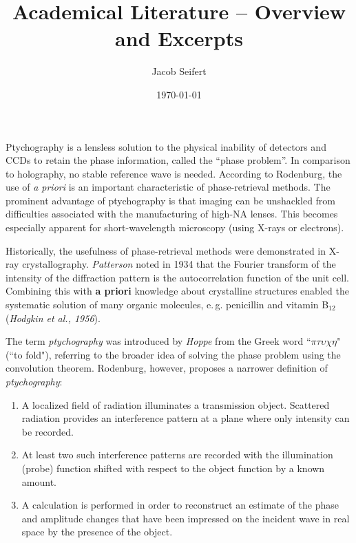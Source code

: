 \documentclass{article}
\title{Academical Literature -- Overview and Excerpts}
\author{Jacob Seifert}
\date{\today}
\begin{document}
\maketitle

\tableofcontents
\newpage

\section{\cite{Rodenburg2008-ww} }
Ptychography is a lensless solution to the physical inability of detectors and CCDs to retain the phase information, called the ``phase problem''. In comparison to holography, no stable reference wave is needed.
According to Rodenburg, the use of \textit{a priori} is an important characteristic of phase-retrieval methods.
The prominent advantage of ptychography is that imaging can be unshackled from difficulties associated with the manufacturing of high-NA lenses. This becomes especially apparent for short-wavelength microscopy (using X-rays or electrons).

Historically, the usefulness of phase-retrieval methods were demonstrated in X-ray crystallography. \textit{Patterson} noted in 1934 that the Fourier transform of the intensity of the diffraction pattern is the autocorrelation function of the unit cell. Combining this with \textbf{a priori} knowledge about crystalline structures enabled the systematic solution of many organic molecules, e.\,g. penicillin and vitamin B$_{12}$ (\textit{Hodgkin et al., 1956}).

The term \textit{ptychography} was introduced by \textit{Hoppe} from the Greek word ``$\pi\tau\upsilon\chi\eta$" (``to fold"), referring to the broader idea of solving the phase problem using the convolution theorem. Rodenburg, however, proposes a narrower definition of \textit{ptychography}:
\begin{enumerate}
    \item A localized field of radiation illuminates a transmission object. Scattered radiation provides an interference pattern at a plane where only intensity can be recorded.
    \item At least two such interference patterns are recorded with the illumination (probe) function shifted with respect to the object function by a known amount.
    \item A calculation is performed in order to reconstruct an estimate of the phase and amplitude changes that have been impressed on the incident wave in real space by the presence of the object.
\end{enumerate}
\end{document}
